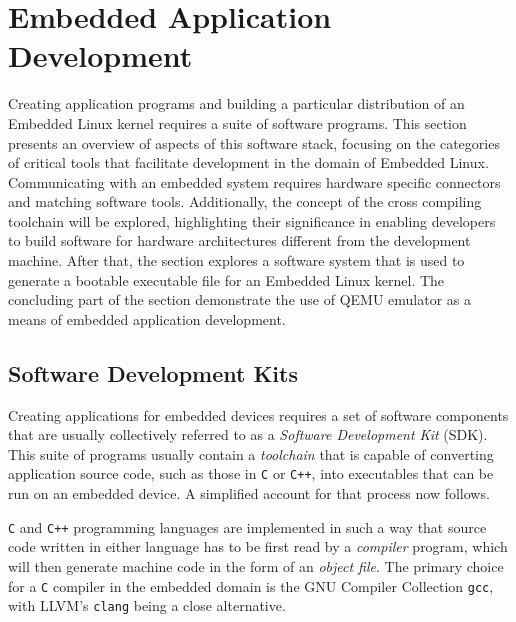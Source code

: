 \section{Embedded Application Development}

Creating application programs and building a particular distribution of an Embedded Linux kernel requires a suite of software programs. This section presents an overview of aspects of this software stack, focusing on the categories of critical tools that facilitate development in the domain of Embedded Linux. Communicating with an embedded system requires hardware specific connectors and matching software tools. Additionally, the concept of the cross compiling toolchain will be explored, highlighting their significance in enabling developers to build software for hardware architectures different from the development machine. After that, the section explores a software system that is used to generate a bootable executable file for an Embedded Linux kernel. The concluding part of the section demonstrate the use of QEMU emulator as a means of embedded application development.

\subsection{Software Development Kits}

Creating applications for embedded devices requires a set of software components that are usually collectively referred to as a \textit{Software Development Kit} (SDK). This suite of programs usually contain a \textit{toolchain} that is capable of converting application source code, such as those in \texttt{C}  or \texttt{C++}, into executables that can be run on an embedded device. A simplified account for that process now follows.

\texttt{C} and \texttt{C++} programming languages are implemented in such a way that source code written in either language has to be first read by a \textit{compiler} program, which will then generate machine code in the form of an \textit{object file}. The primary choice for a \texttt{C} compiler in the embedded domain is the GNU Compiler Collection \texttt{gcc}, with LLVM's \texttt{clang} being a close alternative.

\begin{figure}[H]
	\centering
\end{figure}

